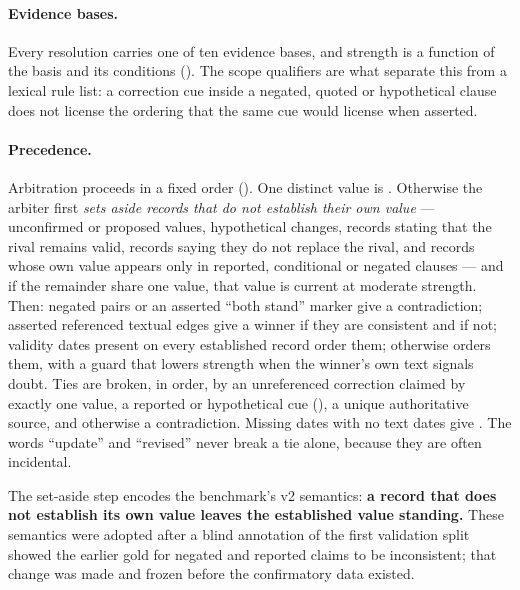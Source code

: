 \paragraph{Evidence bases.} Every resolution carries one of ten evidence bases, and strength is a function of the
basis and its conditions (). The scope qualifiers are what separate this from a lexical rule
list: a correction cue inside a negated, quoted or hypothetical clause does not license the ordering that the same
cue would license when asserted.



\paragraph{Precedence.} Arbitration proceeds in a fixed order (). One distinct value is
. Otherwise the arbiter first \emph{sets aside records that do not establish their own value} ---
unconfirmed or proposed values, hypothetical changes, records stating that the rival remains valid, records saying
they do not replace the rival, and records whose own value appears only in reported, conditional or negated clauses
--- and if the remainder share one value, that value is current at moderate strength. Then: negated pairs or an
asserted ``both stand'' marker give a contradiction; asserted referenced textual edges give a winner if they are
consistent and  if not; validity dates present on every established record order them; otherwise
 orders them, with a guard that lowers strength when the winner's own text signals doubt. Ties
are broken, in order, by an unreferenced correction claimed by exactly one value, a reported or hypothetical cue
(), a unique authoritative source, and otherwise a contradiction. Missing dates with no text dates
give . The words ``update'' and ``revised'' never break a tie alone, because they are often
incidental.

The set-aside step encodes the benchmark's v2 semantics: \textbf{a record that does not establish its own value
leaves the established value standing.} These semantics were adopted after a blind annotation of the first
validation split showed the earlier gold for negated and reported claims to be inconsistent; that change was made
and frozen before the confirmatory data existed.



